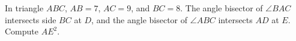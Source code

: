 In triangle $ABC$, $AB=7$, $AC=9$, and $BC=8$. The angle bisector of $\angle{BAC}$ intersects side $BC$ at $D$, and the angle bisector of $\angle{ABC}$ intersects $AD$ at $E$. Compute $AE^2$.